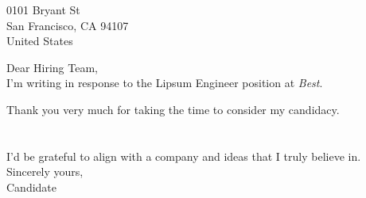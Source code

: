 \documentclass[a4paper]{./src/resume-cv}
\begin{document}

\maketitlearea{-}{}

\vfill
\begin{minipage}[t]{\textwidth}
    0101 Bryant St\\
    San Francisco, CA 94107\\
    United States
\end{minipage}

\todaysdate

\vfill
\begin{minipage}[t]{\textwidth}
    \sectionsep
    \fontsize{12pt}{14pt}\selectfont %

    Dear Hiring Team,
    \sectionsep\\

    I'm writing in response to the Lipsum Engineer position at \textit{Best}. \par Thank you very much for taking the time to consider my candidacy. 
    \subsectionsep\\
    
    \blindtext
    \\

    \blindtext
    \\

    I'd be grateful to align with a company and ideas that I truly believe in. 
    \subsectionsep\\

    Sincerely yours,
    \subsectionsep\\

    Candidate 
\end{minipage}
\vfill
\end{document}
